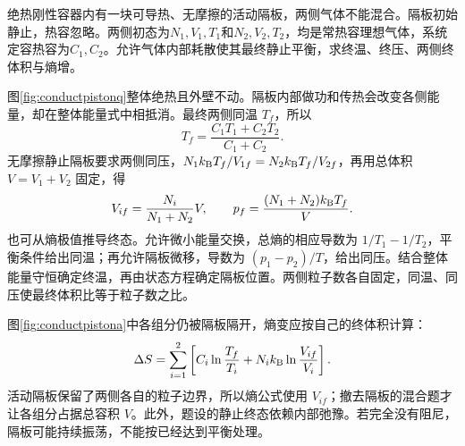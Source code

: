 \begin{example}[导热活动隔板后的平衡状态]
绝热刚性容器内有一块可导热、无摩擦的活动隔板，两侧气体不能混合。隔板初始静止，热容忽略。两侧初态为$N_1,V_1,T_1$和$N_2,V_2,T_2$，均是常热容理想气体，系统定容热容为$C_1,C_2$。允许气体内部耗散使其最终静止平衡，求终温、终压、两侧终体积与熵增。
\end{example}
\begin{solution}
图\ref{fig:conductpistonq}整体绝热且外壁不动。隔板内部做功和传热会改变各侧能量，却在整体能量式中相抵消。最终两侧同温 $T_f$，所以
\[
 T_f=\frac{C_1T_1+C_2T_2}{C_1+C_2}.
\]
无摩擦静止隔板要求两侧同压，$N_1k_{\mathrm B} T_f/V_{1f}=N_2k_{\mathrm B} T_f/V_{2f}$，再用总体积 $V=V_1+V_2$ 固定，得
\[
 V_{if}=\frac{N_i}{N_1+N_2}V,\qquad
 p_f=\frac{(N_1+N_2)k_{\mathrm B} T_f}{V}.
\]
也可从熵极值推导终态。允许微小能量交换，总熵的相应导数为 $1/T_1-1/T_2$，平衡条件给出同温；再允许隔板微移，导数为 $(p_1-p_2)/T$，给出同压。结合整体能量守恒确定终温，再由状态方程确定隔板位置。两侧粒子数各自固定，同温、同压使最终体积比等于粒子数之比。

图\ref{fig:conductpistona}中各组分仍被隔板隔开，熵变应按自己的终体积计算：
\[
 \Delta S=\sum_{i=1}^2\left[C_i\ln\frac{T_f}{T_i}
 +N_ik_{\mathrm B}\ln\frac{V_{if}}{V_i}\right].
\]
活动隔板保留了两侧各自的粒子边界，所以熵公式使用 $V_{if}$；撤去隔板的混合题才让各组分占据总容积 $V$。此外，题设的静止终态依赖内部弛豫。若完全没有阻尼，隔板可能持续振荡，不能按已经达到平衡处理。
\end{solution}

